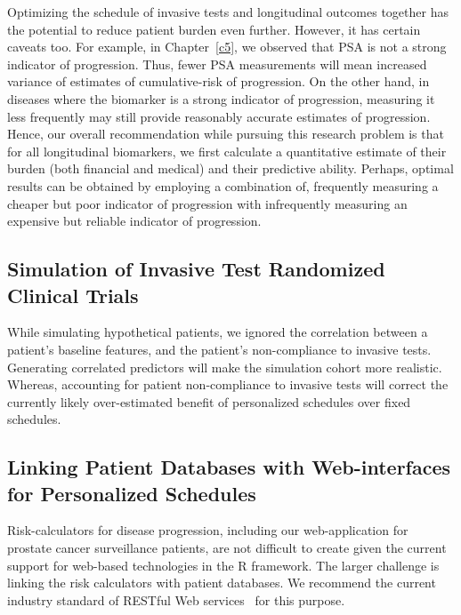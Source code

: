 Optimizing the schedule of invasive tests and longitudinal outcomes together has the potential to reduce patient burden even further. However, it has certain caveats too. For example, in Chapter~\ref{c5}, we observed that PSA is not a strong indicator of progression. Thus, fewer PSA measurements will mean increased variance of estimates of cumulative-risk of progression. On the other hand, in diseases where the biomarker is a strong indicator of progression, measuring it less frequently may still provide reasonably accurate estimates of progression. Hence, our overall recommendation while pursuing this research problem is that for all longitudinal biomarkers, we first calculate a quantitative estimate of their burden (both financial and medical) and their predictive ability. Perhaps, optimal results can be obtained by employing a combination of, frequently measuring a cheaper but poor indicator of progression with infrequently measuring an expensive but reliable indicator of progression.

\subsection{Simulation of Invasive Test Randomized Clinical Trials}
While simulating hypothetical patients, we ignored the correlation between a patient's baseline features, and the patient's non-compliance to invasive tests. Generating correlated predictors will make the simulation cohort more realistic. Whereas, accounting for patient non-compliance to invasive tests will correct the currently likely over-estimated benefit of personalized schedules over fixed schedules.

\subsection{Linking Patient Databases with Web-interfaces for Personalized Schedules}
Risk-calculators for disease progression, including our web-application for prostate cancer surveillance patients, are not difficult to create given the current support for web-based technologies in the R framework. The larger challenge is linking the risk calculators with patient databases. We recommend the current industry standard of RESTful Web services~\citep{rodriguez2008restful} for this purpose. 